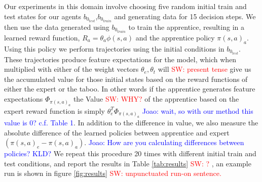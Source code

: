 \documentclass[letterpaper]{article}
\newcommand{\sw}[1]{\textcolor{red}{SW: #1}}
\newcommand{\jm}[1]{\textcolor{blue}{Joao: #1}}
\newcommand{\sw}[1]{}
\newcommand{\jm}[1]{}
\begin{document}
Our experiments in this domain involve choosing five random initial train and test states for our agents $b_{0_{test}}$,$b_{0_{train}}$ and generating data for 15 decision steps. We then use the data generated using $b_{0_{train}}$ to train the apprentice, resulting in a learned reward function, $R_a = \theta_a\phi(s,a)$ and the apprentice policy $\pi(s,a)_a$. Using this policy we perform trajectories using the initial conditions in $b_{0_{test}}$. These trajectories produce feature expectations for the model, which when multiplied with either of the weight vectors $\theta_e,\theta_t$ will \sw{present tense} give us the accumulated value for those initial states based on the reward functions of either the expert or the taboo. In other words if the apprentice generates feature expectations $\Phi_{\pi(s,a)_a}$ the Value \sw{WHY?} of the apprentice based on the expert reward function is simply $\theta_e^T\Phi_{\pi(s,a)_a}$ \jm{wait, so with our method this value is $0$? c.f. Table 1}. In addition to the difference in value, we also measure the absolute difference of the learned policies between apprentice and expert $(\pi(s,a)_e - \pi(s,a)_a)$. 
\jm{How are you calculating differences between policies? KLD?} We repeat this procedure 20 times with different initial train and test conditions, and report the results in Table \ref{tab:results} \sw{?} , an example run is shown in figure \ref{fig:results} \sw{unpunctuated run-on sentence.}
\end{document}
